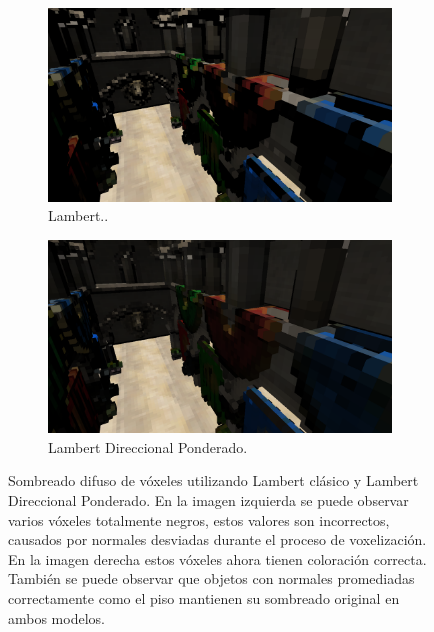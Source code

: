 \begin{figure}[H]
	\centering
	\begin{subfigure}[t]{0.49\textwidth}
		\centering
		\captionsetup{justification=centering}
		\includegraphics[width=\linewidth]{media/classic_lambert.png}
		\caption*{Lambert..}
	\end{subfigure}%
	\hspace{0.01\textwidth}
	\begin{subfigure}[t]{0.49\textwidth}
		\centering
		\captionsetup{justification=centering}
		\includegraphics[width=\linewidth]{media/dir_lambert.png}
		\caption*{Lambert Direccional Ponderado.}
	\end{subfigure}%
	\caption{Sombreado difuso de vóxeles utilizando Lambert clásico y Lambert Direccional Ponderado. En la imagen izquierda se puede observar varios vóxeles totalmente negros, estos valores son incorrectos, causados por normales desviadas durante el proceso de voxelización. En la imagen derecha estos vóxeles ahora tienen coloración correcta. También se puede observar que objetos con normales promediadas correctamente como el piso mantienen su sombreado original en ambos modelos.}
	\label{fig:lambert_dir_diff}
\end{figure}

